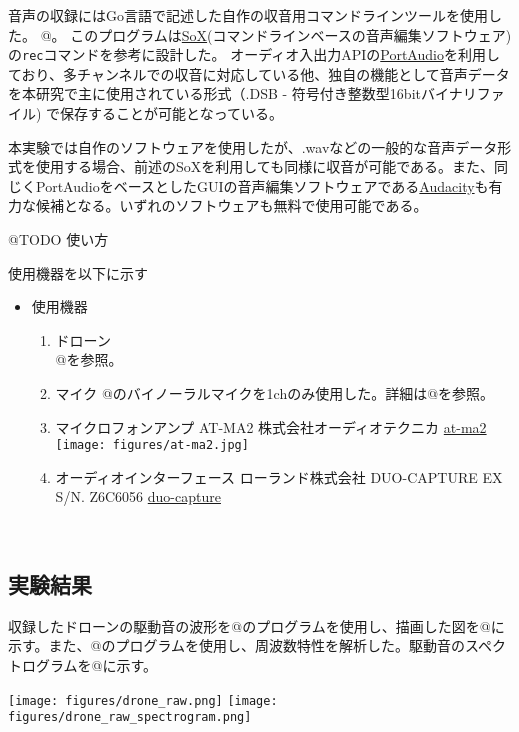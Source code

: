 音声の収録にはGo言語で記述した自作の収音用コマンドラインツールを使用した。
@。
このプログラムは\href{http://sox.sourceforge.net/}{SoX}(コマンドラインベースの音声編集ソフトウェア)の\texttt{rec}コマンドを参考に設計した。
オーディオ入出力APIの\href{http://www.portaudio.com/}{PortAudio}を利用しており、多チャンネルでの収音に対応している他、独自の機能として音声データを本研究で主に使用されている形式（.DSB
- 符号付き整数型16bitバイナリファイル)
で保存することが可能となっている。

本実験では自作のソフトウェアを使用したが、.wavなどの一般的な音声データ形式を使用する場合、前述のSoXを利用しても同様に収音が可能である。また、同じくPortAudioをベースとしたGUIの音声編集ソフトウェアである\href{https://www.audacityteam.org/}{Audacity}も有力な候補となる。いずれのソフトウェアも無料で使用可能である。

@TODO 使い方

使用機器を以下に示す

\begin{itemize}
\tightlist
\item
  使用機器

  \begin{enumerate}
  \def\labelenumi{\arabic{enumi}.}
  \item
    ドローン\\
    @を参照。
  \item
    マイク @のバイノーラルマイクを1chのみ使用した。詳細は@を参照。
  \item
    マイクロフォンアンプ AT-MA2 株式会社オーディオテクニカ
    \href{https://www.audio-technica.co.jp/product/AT-MA2}{at-ma2}
    \texttt{[image: figures/at-ma2.jpg]}
  \item
    オーディオインターフェース ローランド株式会社 DUO-CAPTURE EX S/N.
    Z6C6056
    \href{https://www.roland.com/jp/products/duo-capture_ex/}{duo-capture}
  \end{enumerate}
\end{itemize}

\
\subsection{実験結果}\label{ux5b9fux9a13ux7d50ux679c}

収録したドローンの駆動音の波形を@のプログラムを使用し、描画した図を@に示す。また、@のプログラムを使用し、周波数特性を解析した。駆動音のスペクトログラムを@に示す。

\texttt{[image: figures/drone\_raw.png]}
\texttt{[image: figures/drone\_raw\_spectrogram.png]}

